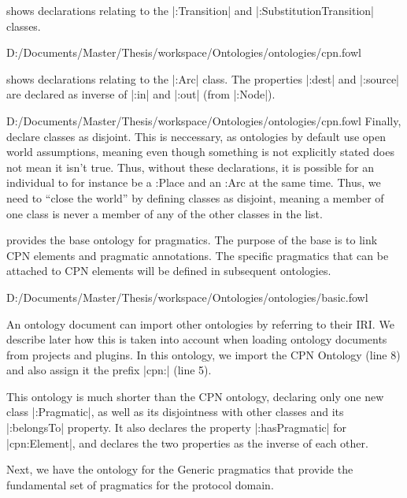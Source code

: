  shows declarations relating to the |:Transition| and
|:SubstitutionTransition| classes.


{D:/Documents/Master/Thesis/workspace/Ontologies/ontologies/cpn.fowl} 

 shows declarations relating to the |:Arc| class. The
properties |:dest| and |:source| are declared as inverse of |:in| and |:out|
(from |:Node|).


{D:/Documents/Master/Thesis/workspace/Ontologies/ontologies/cpn.fowl} 
Finally,  declare classes as disjoint. This is
neccessary, as ontologies by default use open world assumptions, meaning even though something is not
explicitly stated does not mean it isn't true. Thus, without these declarations,
it is possible for an individual to for instance be a :Place and an :Arc at the
same time. Thus, we need to ``close the world'' by defining classes as disjoint,
meaning a member of one class is never a member of any of the other classes in
the list.

 provides the base ontology for pragmatics. The purpose of the
base is to link CPN elements and pragmatic annotations. The specific pragmatics
that can be attached to CPN elements will be defined in subsequent ontologies.
 

{D:/Documents/Master/Thesis/workspace/Ontologies/ontologies/basic.fowl}

An ontology document can import other ontologies by referring to their IRI.  We
describe later how this is taken into account when loading ontology documents
from projects and plugins. In this ontology, we import the CPN Ontology (line 8)
and also assign it the prefix |cpn:| (line 5).

This ontology is much shorter than the CPN ontology, declaring only one new
class |:Pragmatic|, as well as its disjointness with other classes and its |:belongsTo| property. It
also declares the property |:hasPragmatic| for |cpn:Element|, and declares the
two properties as the inverse of each other.

Next, we have the ontology for the Generic pragmatics that provide the
fundamental set of pragmatics for the protocol domain. 

